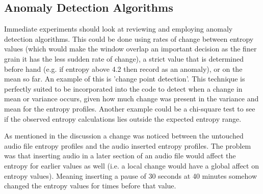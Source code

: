 







\subsection{Anomaly Detection Algorithms}
Immediate experiments should look at reviewing and employing anomaly detection algorithms. This could be done using rates of change between entropy values (which would make the window overlap an important decision as the finer grain it has the less sudden rate of change), a strict value that is determined before hand (e.g. if entropy above 4.2 then record as an anomaly), or on the mean so far. An example of this is 'change point detection'. This technique is perfectly suited to be incorporated into the code to detect when a change in mean or variance occurs, given how much change was present in the variance and mean for the entropy profiles. Another example could be a chi-square test to see if the observed entropy calculations lies outside the expected entropy range. 


As mentioned in the discussion a change was noticed between the untouched audio file entropy profiles and the audio inserted entropy profiles. The problem was that inserting audio in a later section of an audio file would affect the entropy for earlier values as well (i.e. a local change would have a global affect on entropy values). Meaning inserting a pause of 30 seconds at 40 minutes somehow changed the entropy values for times before that value. \\

